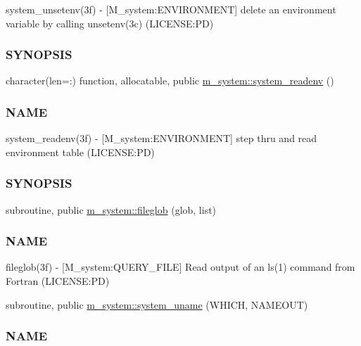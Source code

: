 \begin{DoxyCompactItemize}
\begin{DoxyCompactList}
system\+\_\+unsetenv(3f) -\/ \mbox{[}M\+\_\+system\+:E\+N\+V\+I\+R\+O\+N\+M\+E\+NT\mbox{]} delete an environment variable by calling unsetenv(3c) (L\+I\+C\+E\+N\+SE\+:PD) \subsubsection*{S\+Y\+N\+O\+P\+S\+IS}\end{DoxyCompactList}\item 
character(len=\+:) function, allocatable, public \mbox{\hyperlink{namespacem__system_ae0e43010a82a6a25402568ccb326322d}{m\+\_\+system\+::system\+\_\+readenv}} ()
\begin{DoxyCompactList}\small\item\em \subsubsection*{N\+A\+ME}

system\+\_\+readenv(3f) -\/ \mbox{[}M\+\_\+system\+:E\+N\+V\+I\+R\+O\+N\+M\+E\+NT\mbox{]} step thru and read environment table (L\+I\+C\+E\+N\+SE\+:PD) \subsubsection*{S\+Y\+N\+O\+P\+S\+IS}\end{DoxyCompactList}\item 
subroutine, public \mbox{\hyperlink{namespacem__system_a79656f76ad75168302e0d770052e901e}{m\+\_\+system\+::fileglob}} (glob, list)
\begin{DoxyCompactList}\small\item\em \subsubsection*{N\+A\+ME}

fileglob(3f) -\/ \mbox{[}M\+\_\+system\+:Q\+U\+E\+R\+Y\+\_\+\+F\+I\+LE\mbox{]} Read output of an ls(1) command from Fortran (L\+I\+C\+E\+N\+SE\+:PD) \end{DoxyCompactList}\item 
subroutine, public \mbox{\hyperlink{namespacem__system_a04e5d49509c44bcb2ccabfd80ec8cdfb}{m\+\_\+system\+::system\+\_\+uname}} (W\+H\+I\+CH, N\+A\+M\+E\+O\+UT)
\begin{DoxyCompactList}\small\item\em \subsubsection*{N\+A\+ME}


\end{DoxyCompactList}
\end{DoxyCompactItemize}
